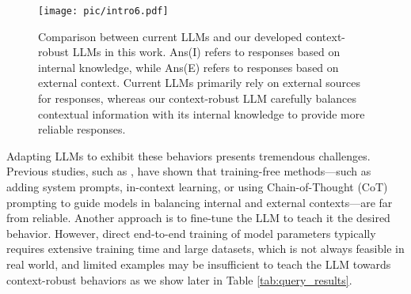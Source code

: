 \begin{figure}[t]
    \centering
    \texttt{[image: pic/intro6.pdf]}
    \caption{ Comparison between current LLMs and our developed context-robust LLMs in this work. Ans(I) refers to responses based on internal knowledge, while Ans(E) refers to responses based on external context. Current LLMs primarily rely on external sources for responses, whereas our context-robust LLM carefully balances contextual information with its internal knowledge to provide more reliable responses.}
    \label{fig:intro}
     \vspace{-0.2in}
\end{figure}

Adapting LLMs to exhibit these behaviors presents tremendous challenges. Previous studies, such as \cite{zeng2024towards}, have shown that training-free methods—such as adding system prompts, in-context learning, or using Chain-of-Thought (CoT) prompting to guide models in balancing internal and external contexts—are far from reliable. Another approach is to fine-tune the LLM to teach it the desired behavior. However, direct end-to-end training of model parameters typically requires extensive training time and large datasets, which is not always feasible in real world, and limited examples may be insufficient to teach the LLM towards context-robust behaviors as we show later in Table \ref{tab:query_results}. 


